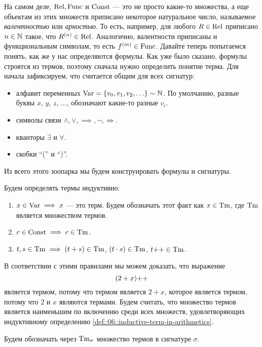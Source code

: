 На самом деле, $\mathrm{Rel}, \mathrm{Func}$ и $\mathrm{Const}$ --- это не просто какие-то множества, а еще объектам из этих множеств приписано некоторое натуральное число, называемое {\it валентностью} или {\it арностью}.
То есть, например, для любого $R \in \mathrm{Rel}$ приписано $n \in \mathbb{N}$ такое, что $R^{(n)} \in \mathrm{Rel}$.
Аналогично, валентности приписаны и функциональным символам, то есть $f^{(m)} \in \mathrm{Func}$.
Давайте теперь попытаемся понять, как же у нас определяются формулы.
Как уже было сказано, формулы строятся из термов, поэтому сначала нужно определить понятие терма.
Для начала зафиксируем, что считается общим для всех сигнатур:
\begin{itemize}
    \item алфавит переменных $\mathrm{Var} = \left\{v_{0}, v_{1}, v_{2}, \ldots\right\} \sim \mathbb{N}$.
    По умолчанию, разные буквы $x$, $y$, $z$, $\dots$, обозначают какие-то разные $v_{i}$.
    \item символы связи $\land, \lor, \implies, \neg, \iff$.
    \item кванторы $\exists$ и $\forall$.
    \item скобки \enquote{(} и \enquote{)}. 
\end{itemize}
Из всего этого зоопарка мы будем конструировать формулы и сигнатуры.

\begin{definition} \label{def::06::inductive-term-in-arithmetics}
    Будем определять термы индуктивно:
    \begin{enumerate}
        \item $x \in \mathrm{Var} \implies x$ --- это терм.
        Будем обозначать этот факт как $x \in \mathrm{Tm}$, где $\mathrm{Tm}$ является множеством термов.
        \item $c \in \mathrm{Const} \implies c \in \mathrm{Tm}$.
        \item $t, s \in \mathrm{Tm} \implies (t + s) \in \mathrm{Tm}$, $(t \cdot s) \in \mathrm{Tm}$, $t{++} \in \mathrm{Tm}$.
    \end{enumerate}
\end{definition}

В соответствии с этими правилами мы можем доказать, что выражение
$$
    (2 + x){++}
$$
является термом, потому что термом является $2 + x$, которое является термом, потому что $2$ и $x$ являются термами.
Будем считать, что множество термов является наименьшим по включению среди всех множеств, удовлетворяющих индуктивному определению \ref{def::06::inductive-term-in-arithmetics}.

\begin{definition}
    Будем обозначать через $\mathrm{Tm}_{\sigma}$ множество термов в сигнатуре $\sigma$.
\end{definition}

